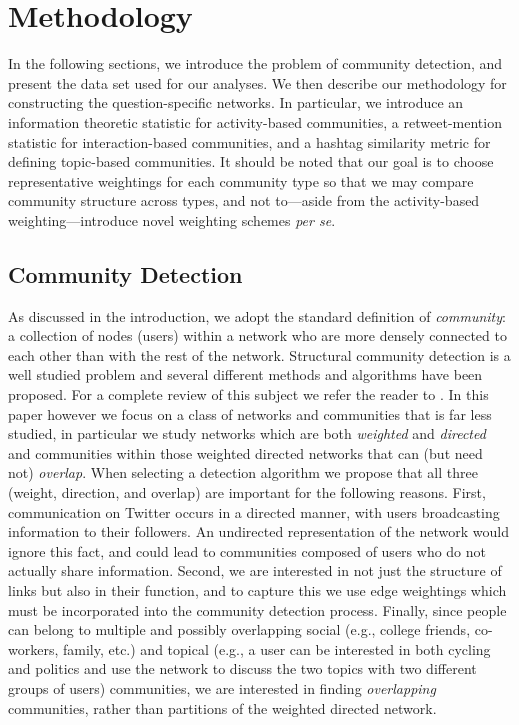 \section{Methodology}
In the following sections, we introduce the problem of community detection, and present the data set used for our analyses. We then describe our methodology for constructing the question-specific networks. In particular, we introduce an information theoretic statistic for activity-based communities, a retweet-mention statistic for interaction-based communities, and a hashtag similarity metric for defining topic-based communities. It should be noted that our goal is to choose representative weightings for each community type so that we may compare community structure across types, and not to---aside from the activity-based weighting---introduce novel weighting schemes \emph{per se}.

\subsection{Community Detection}

As discussed in the introduction, we adopt the standard definition of \emph{community}: a collection of nodes (users) within a network who are more densely connected to each other than with the rest of the network. Structural community detection is a well studied problem and several different methods and algorithms have been proposed. For a complete review of this subject we refer the reader to \cite{porter2009communities, fortunato2010community}. In this paper however we focus on a class of networks and communities that is far less studied, in particular we study networks which are both \textit{weighted} and \textit{directed} and communities within those weighted directed networks that can (but need not) \emph{overlap}. When selecting a detection algorithm we propose that all three (weight, direction, and overlap) are important for the following reasons. First, communication on Twitter occurs in a directed manner, with users broadcasting information to their followers. An undirected representation of the network would ignore this fact, and could lead to communities composed of users who do not actually share information. Second, we are interested in not just the structure of links but also in their function, and to capture this we use edge weightings which must be incorporated into the community detection process. Finally, since people can belong to multiple and possibly overlapping social (e.g., college friends, co-workers, family, etc.) and topical (e.g., a user can be interested in both cycling and politics and use the network to discuss the two topics with two different groups of users) communities, we are interested in finding \textit{overlapping} communities, rather than partitions of the weighted directed network. 

